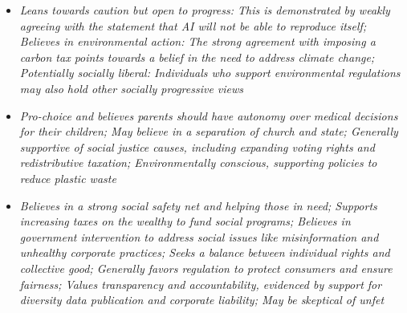 \documentclass[11pt]{article}
\newcommand{\profiletext}[1]{\textit{#1}}
\begin{document}
\begin{itemize}
\item \profiletext{Leans towards caution but open to progress: This is demonstrated by weakly agreeing with the statement that AI will not be able to reproduce itself; Believes in environmental action: The strong agreement with imposing a carbon tax points towards a belief in the need to address climate change; Potentially socially liberal:  Individuals who support environmental regulations may also hold other socially progressive views}
\item \profiletext{Pro-choice and believes parents should have autonomy over medical decisions for their children; May believe in a separation of church and state; Generally supportive of social justice causes, including expanding voting rights and redistributive taxation; Environmentally conscious, supporting policies to reduce plastic waste}
\item \profiletext{Believes in a strong social safety net and helping those in need; Supports increasing taxes on the wealthy to fund social programs; Believes in government intervention to address social issues like misinformation and unhealthy corporate practices; Seeks a balance between individual rights and collective good; Generally favors regulation to protect consumers and ensure fairness; Values transparency and accountability, evidenced by support for diversity data publication and corporate liability; May be skeptical of unfet}
\end{itemize}
\end{document}
